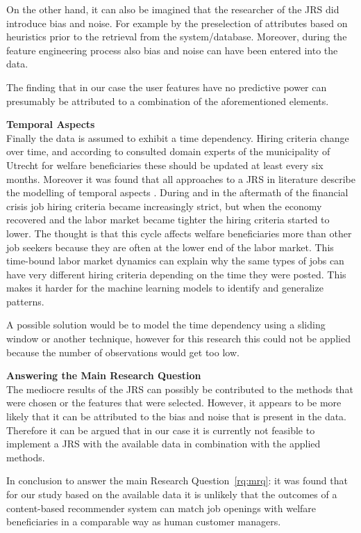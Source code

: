 On the other hand, it can also be imagined that the researcher of the JRS did introduce bias and noise.
For example by the preselection of attributes based on heuristics prior to the retrieval from the system/database.
Moreover, during the feature engineering process also bias and noise can have been entered into the data.

The finding that in our case the user features have no predictive power can presumably be attributed to a combination of the aforementioned elements. 

\noindent
\textbf{Temporal Aspects} \\
Finally the data is assumed to exhibit a time dependency.
Hiring criteria change over time, and according to consulted domain experts of the municipality of Utrecht for welfare beneficiaries these should be updated at least every six months. 
Moreover it was found that all approaches to a JRS in literature describe the modelling of temporal aspects  \cite{kenthapadi2017personalized, T.Al-Otaibi2012ASystems, Zheng2012JobSurvey, hong2013job}.
During and in the aftermath of the financial crisis job hiring criteria became increasingly strict, but when the economy recovered and the labor market became tighter the hiring criteria started to lower. 
The thought is that this cycle affects welfare beneficiaries more than other job seekers because they are often at the lower end of the labor market.
This time-bound labor market dynamics can explain why the same types of jobs can have very different hiring criteria depending on the time they were posted.
This makes it harder for the machine learning models to identify and generalize patterns.

A possible solution would be to model the time dependency using a sliding window or another technique, however for this research this could not be applied because the number of observations would get too low.

\noindent
\textbf{Answering the Main Research Question}\\
The mediocre results of the JRS can possibly be contributed to the methods that were chosen or the features that were selected. 
However, it appears to be more likely that it can be attributed to the bias and noise that is present in the data.
Therefore it can be argued that in our case it is currently not feasible to implement a JRS with the available data in combination with the applied methods. 

In conclusion to answer the main Research Question~\ref{rq:mrq}: it was found that for our study based on the available data it is unlikely that the outcomes of a content-based recommender system can match job openings with welfare beneficiaries in a comparable way as human customer managers. 


